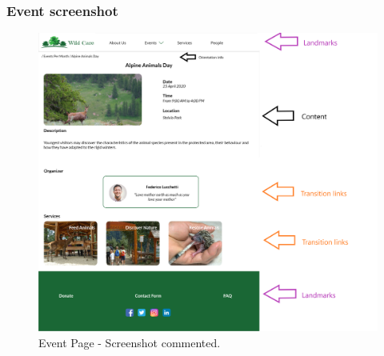 \subsubsection{Event screenshot}
\begin{figure}[h!]
	\centering
	\begin{minipage}[b]{1\textwidth}
    		\includegraphics[width=\textwidth]{./assets/mockups/eventdetails_commented.png}
		\caption{Event Page - Screenshot commented.}
	\end{minipage}
\end{figure}
\FloatBarrier